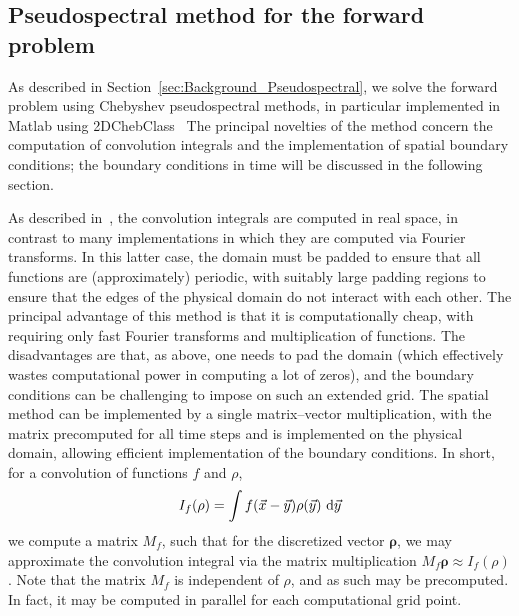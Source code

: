 \subsection{Pseudospectral method for the forward problem}\label{sec:Method_PseudospectralForward}

As described in Section~\ref{sec:Background_Pseudospectral}, we solve the forward problem using
Chebyshev pseudospectral methods, in particular implemented in Matlab using 2DChebClass~\cite{NGYSK17,2DChebClass}
%
The principal novelties of the method concern the computation of convolution integrals and the implementation
of spatial boundary conditions; the boundary conditions in time will be discussed in the following section.

As described in~\cite{NGYSK17}, the convolution integrals are computed in real space, in contrast to many implementations
in which they are computed via Fourier transforms.  In this latter case, the domain must be padded to ensure that
all functions are (approximately) periodic, with suitably large padding regions to ensure that the edges of the 
physical domain do not interact with each other.  The principal advantage of this method is that it is
computationally cheap, with requiring only fast Fourier transforms and multiplication of functions.  The 
disadvantages are that, as above, one needs to pad the domain (which effectively wastes computational power
in computing a lot of zeros), and the boundary conditions can be challenging to impose on such an extended
grid.  The spatial method can be implemented by a single matrix--vector multiplication, with the matrix
precomputed for all time steps and is implemented on the physical domain, allowing efficient implementation
of the boundary conditions.  In short, for a convolution of functions $f$ and $\rho$,
\[
	I_f (\rho)= \int f(\vec{x}-\vec{y}) \rho(\vec{y}) ~ {\rm d}\vec{y}
\]
we compute a matrix $M_f$, such that for the discretized vector $\boldsymbol{\rho}$, we may approximate the
convolution integral via the matrix multiplication $M_f \boldsymbol{\rho} \approx I_f(\rho)$.  Note that
the matrix $M_f$ is independent of $\rho$, and as such may be precomputed.  In fact, it may be computed in parallel
for each computational grid point.

